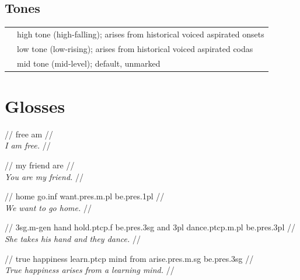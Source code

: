 \documentclass{article}
\begin{document}
\subsection{Tones}

\begin{xltabular}{\textwidth}{lL}
   & high tone (high-falling); arises from historical voiced aspirated onsets \\
   & low tone (low-rising); arises from historical voiced aspirated codas \\
   & mid tone (mid-level); default, unmarked \\
\end{xltabular}

\newpage\section{Glosses}

\ex
\begingl
\gla {}   //
 free am //
\\\textit{I am free.} //
\endgl
\xe

\ex
\begingl
\gla {}   \ipa{\~\ae:} //
 my friend are //
\\\textit{You are my friend.} //
\endgl
\xe

\ex
\begingl
\gla {}     //
 home go.{\sc inf} want.{\sc pres.m.pl} be.{\sc pres.1pl} //
\\\textit{We want to go home.} //
\endgl
\xe

\ex
\begingl
\gla {}         //
 {\sc 3sg.m}-{\sc gen} hand hold.{\sc ptcp.f} be.{\sc pres.3sg} and {\sc 3pl} dance.{\sc ptcp.m.pl} be.{\sc pres.3pl} //
\\\textit{She takes his hand and they dance.} //
\endgl
\xe

\ex
\begingl
\gla {}       //
\glb true happiness learn.{\sc ptcp} mind from arise.{\sc pres.m.sg} be.{\sc pres.3sg} //
\\\textit{True happiness arises from a learning mind.} //
\endgl
\xe
\end{document}
